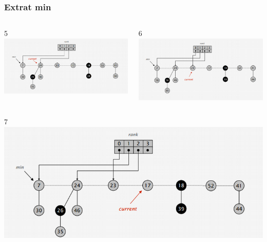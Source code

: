 \documentclass{beamer}
\begin{document}
\begin{frame}
\begin{columns}[t]
   \end{columns}
\end{frame}

\begin{frame}
 \frametitle{Extrat min}
 \begin{columns}[t]
 5
    \includegraphics[width =1 \textwidth]{imagenes/delete5.png}
      
    6
    \includegraphics[width =1 \textwidth]{imagenes/delete6.png}

   \end{columns}
   \begin{columns}[t]
   7
    \includegraphics[width =1 \textwidth]{imagenes/delete7.png}
      

\end{columns}
\end{frame}
\end{document}
